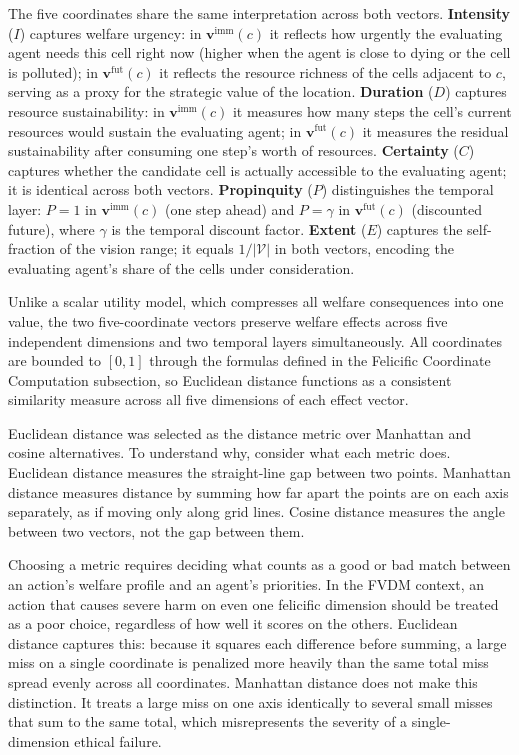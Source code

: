 \documentclass{icsthesis}
\begin{document}
\begin{mainmatter}
The five coordinates share the same interpretation across both vectors. \textbf{Intensity} ($I$) captures welfare urgency: in $\mathbf{v}^{\mathrm{imm}}(c)$ it reflects how urgently the evaluating agent needs this cell right now (higher when the agent is close to dying or the cell is polluted); in $\mathbf{v}^{\mathrm{fut}}(c)$ it reflects the resource richness of the cells adjacent to $c$, serving as a proxy for the strategic value of the location. \textbf{Duration} ($D$) captures resource sustainability: in $\mathbf{v}^{\mathrm{imm}}(c)$ it measures how many steps the cell's current resources would sustain the evaluating agent; in $\mathbf{v}^{\mathrm{fut}}(c)$ it measures the residual sustainability after consuming one step's worth of resources. \textbf{Certainty} ($C$) captures whether the candidate cell is actually accessible to the evaluating agent; it is identical across both vectors. \textbf{Propinquity} ($P$) distinguishes the temporal layer: $P = 1$ in $\mathbf{v}^{\mathrm{imm}}(c)$ (one step ahead) and $P = \gamma$ in $\mathbf{v}^{\mathrm{fut}}(c)$ (discounted future), where $\gamma$ is the temporal discount factor. \textbf{Extent} ($E$) captures the self-fraction of the vision range; it equals $1/|\mathcal{V}|$ in both vectors, encoding the evaluating agent's share of the cells under consideration.

Unlike a scalar utility model, which compresses all welfare consequences into one value, the two five-coordinate vectors preserve welfare effects across five independent dimensions and two temporal layers simultaneously. All coordinates are bounded to $[0,1]$ through the formulas defined in the Felicific Coordinate Computation subsection, so Euclidean distance functions as a consistent similarity measure across all five dimensions of each effect vector.

Euclidean distance was selected as the distance metric over Manhattan and cosine alternatives. To understand why, consider what each metric does. Euclidean distance measures the straight-line gap between two points. Manhattan distance measures distance by summing how far apart the points are on each axis separately, as if moving only along grid lines. Cosine distance measures the angle between two vectors, not the gap between them.

Choosing a metric requires deciding what counts as a good or bad match between an action's welfare profile and an agent's priorities. In the FVDM context, an action that causes severe harm on even one felicific dimension should be treated as a poor choice, regardless of how well it scores on the others. Euclidean distance captures this: because it squares each difference before summing, a large miss on a single coordinate is penalized more heavily than the same total miss spread evenly across all coordinates. Manhattan distance does not make this distinction. It treats a large miss on one axis identically to several small misses that sum to the same total, which misrepresents the severity of a single-dimension ethical failure.


\end{mainmatter}
\end{document}
